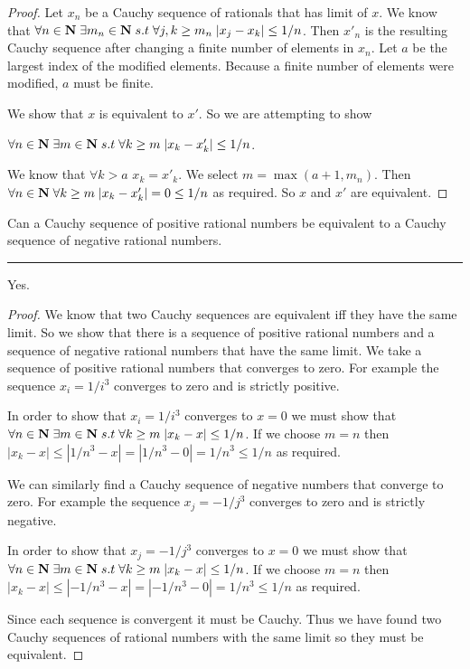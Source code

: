 \documentclass[11pt]{article}
\begin{document}
\begin{proof}

Let $x_n$ be a Cauchy sequence of rationals that has limit of $x$. We know that $\forall n \in \mathbf{N} \; \exists m_n \in \mathbf{N} \; s.t \; \forall j,k \geq m_n \; |x_j - x_k| \leq 1/n$. Then $x'_n$ is the resulting Cauchy sequence after changing a finite number of elements in $x_n$. Let $a$ be the largest index of the modified elements. Because a finite number of elements were modified, $a$ must be finite.

We show that $x $ is equivalent to $x'$. So we are attempting to show 

$\forall n \in \mathbf{N} \; \exists m \in \mathbf{N} \; s.t \; \forall k \geq m \; |x_k - x'_k| \leq 1/n$. 

We know that $\forall  k > a$ $x_k = x'_k$. We select $m = \max(a + 1, m_n)$. Then 
$\forall n \in \mathbf{N} \; \forall k \geq m \; |x_k - x'_k| = 0 \leq 1/n$ as required. So $x$ and $x'$ are equivalent.

\end{proof}



\newpage
{}
Can a Cauchy sequence of positive rational numbers be equivalent to a Cauchy sequence of negative rational numbers. 
\hrule

Yes. 

\begin{proof}

We know that two Cauchy sequences are equivalent iff they have the same limit. So we show that there is a sequence of positive rational numbers and a sequence of negative rational numbers that have the same limit. We take a sequence of positive rational numbers that converges to zero. For example the sequence $x_i = 1/i^3$ converges to zero and is strictly positive. 

In order to show that $x_i = 1/i^3$ converges to $x = 0$ we must show that $\forall n \in \mathbf{N} \; \exists m \in \mathbf{N} \; s.t \; \forall k \geq m \; |x_k - x| \leq 1/n$. If we choose $m = n$ then $|x_k - x| \leq |1/n^3 - x| = |1/n^3 - 0| = 1/n^3 \leq 1/n$ as required.

We can similarly find a Cauchy sequence of negative numbers that converge to zero. For example the sequence $x_j = -1/j^3$ converges to zero and is strictly negative. 

In order to show that $x_j = -1/j^3$ converges to $x = 0$ we must show that $\forall n \in \mathbf{N} \; \exists m \in \mathbf{N} \; s.t \; \forall k \geq m \; |x_k - x| \leq 1/n$. If we choose $m = n$ then $|x_k - x| \leq |-1/n^3 - x| = |-1/n^3 - 0| = 1/n^3 \leq 1/n$ as required.

Since each sequence is convergent it must be Cauchy. Thus we have found two Cauchy sequences of rational numbers with the same limit so they must be equivalent. 

\end{proof}
\end{document}
